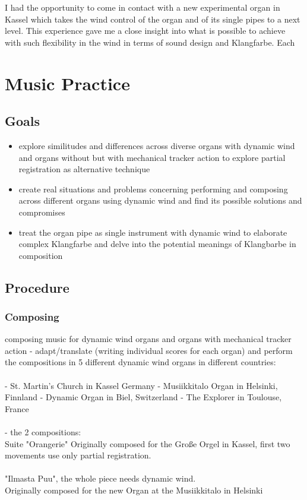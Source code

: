 I had the opportunity to come in contact with a new experimental organ in Kassel which takes the wind control of the organ and of its single pipes to a next level. This experience gave me a close insight into what is possible to achieve with such flexibility in the wind in terms of sound design and Klangfarbe. Each

\section{Music Practice}

\subsection{Goals}

\begin{itemize}
\item explore similitudes and differences across diverse organs with dynamic wind and organs without but with mechanical tracker action to explore partial registration as alternative technique
\item create real situations and problems concerning performing and composing across different organs using dynamic wind and find its possible solutions and compromises
\item treat the organ pipe as single instrument with dynamic wind to elaborate complex Klangfarbe and delve into the potential meanings of Klangbarbe in composition
\end{itemize}

\subsection{Procedure}

\subsubsection{Composing} 
composing music for dynamic wind organs and organs with mechanical tracker action 
- adapt/translate (writing individual scores for each organ) and perform the compositions in 5 different dynamic wind organs in different countries: \\
\\
- St. Martin's Church in Kassel Germany
- Musiikkitalo Organ in Helsinki, Finnland
- Dynamic Organ in Biel, Switzerland
- The Explorer in Toulouse, France\\
\\
- the 2 compositions: 
\\
Suite "Orangerie" 
Originally composed for the Große Orgel in Kassel, first two movements use only partial registration.\\
\\
"Ilmasta Puu", the whole piece needs dynamic wind.\\
Originally composed for the new Organ at the Musiikkitalo in Helsinki\\

